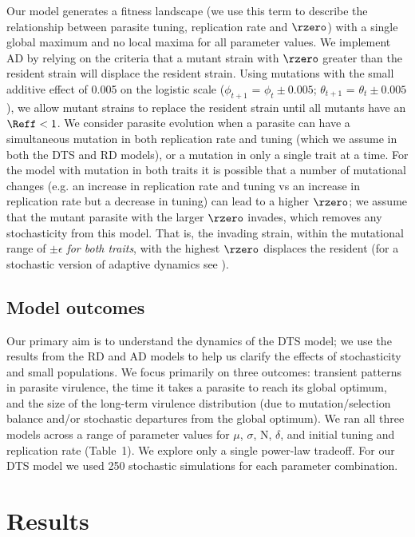 Our model generates a fitness landscape (we use this term to describe the relationship between parasite tuning, replication rate and $\rzero$) with a single global maximum and no local maxima for all parameter values. We implement AD by relying on the criteria that a mutant strain with $\rzero$ greater than the resident strain will displace the resident strain. Using mutations with the small additive effect of 0.005 on the logistic scale ($\phi_{t+1}$ = $\phi_t \pm 0.005$; $\theta_{t+1}$ = $\theta_t \pm 0.005$), we allow mutant strains to replace the resident strain until all mutants have an $\Reff < 1$. We consider parasite evolution when a parasite can have a simultaneous mutation in both replication rate and tuning (which we assume in both the DTS and RD models), or a mutation in only a single trait at a time. For the model with mutation in both traits it is possible that a number of mutational changes (e.g. an increase in replication rate and tuning vs an increase in replication rate but a decrease in tuning) can lead to a higher $\rzero$; we assume that the mutant parasite with the larger $\rzero$ invades, which removes any stochasticity from this model. That is, the invading strain, within the mutational range of $\pm \epsilon$ \emph{for both traits}, with the highest $\rzero$ displaces the resident (for a stochastic version of adaptive dynamics see \citealt{Parsonsetal.2018}).

\subsection*{Model outcomes}

Our primary aim is to understand the dynamics of the DTS model; we use the results from the RD and AD models to help us clarify the effects of stochasticity and small populations. We focus primarily on three outcomes: transient patterns in parasite virulence, the time it takes a parasite to reach its global optimum, and the size of the long-term virulence distribution (due to mutation/selection balance and/or stochastic departures from the global optimum). We ran all three models across a range of parameter values for $\mu$, $\sigma$, N, $\delta$, and initial tuning and replication rate (Table~1). We explore only a single power-law tradeoff. For our DTS model we used 250 stochastic simulations for each parameter combination.



\section*{Results}

